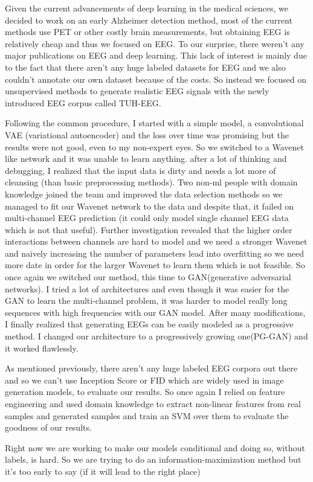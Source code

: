 \documentclass[11pt, a4paper]{awesome-cv}
\begin{document}
\begin{cvletter}
Given the current advancements of deep learning in the medical sciences, we decided to work on an early Alzheimer detection method, most of the current methods use PET or other costly brain measurements, but obtaining EEG is relatively cheap and thus we focused on EEG. To our surprise, there weren’t any major publications on EEG and deep learning. This lack of interest is mainly due to the fact that there aren’t any huge labeled datasets for EEG and we also couldn’t annotate our own dataset because of the costs. So instead we focused on unsupervised methods to generate realistic EEG signals with the newly introduced EEG corpus called TUH-EEG.

Following the common procedure, I started with a simple model, a convolutional VAE (variational autoencoder) and the loss over time was promising but the results were not good, even to my non-expert eyes. So we switched to a Wavenet like network and it was unable to learn anything. after a lot of thinking and debugging, I realized that the input data is dirty and needs a lot more of cleansing (than basic preprocessing methods). Two non-ml people with domain knowledge joined the team and improved the data selection methods so we managed to fit our Wavenet network to the data and despite that, it failed on multi-channel EEG prediction (it could only model single channel EEG data which is not that useful). Further investigation revealed that the higher order interactions between channels are hard to model and we need a stronger Wavenet and naively increasing the number of parameters lead into overfitting so we need more date in order for the larger Wavenet to learn them which is not feasible. So once again we switched our method, this time to GAN(generative adversarial networks). I tried a lot of architectures and even though it was easier for the GAN to learn the multi-channel problem, it was harder to model really long sequences with high frequencies with our GAN model. After many modifications, I finally realized that generating EEGs can be easily modeled as a progressive method. I changed our architecture to a progressively growing one(PG-GAN) and it worked flawlessly.

As mentioned previously, there aren’t any huge labeled EEG corpora out there and so we can’t use Inception Score or FID which are widely used in image generation models, to evaluate our results. So once again I relied on feature engineering and used domain knowledge to extract non-linear features from real samples and generated samples and train an SVM over them to evaluate the goodness of our results.

Right now we are working to make our models conditional and doing so, without labels, is hard. So we are trying to do an information-maximization method but it’s too early to say (if it will lead to the right place)

\end{cvletter}
\makeletterclosing
\end{document}
